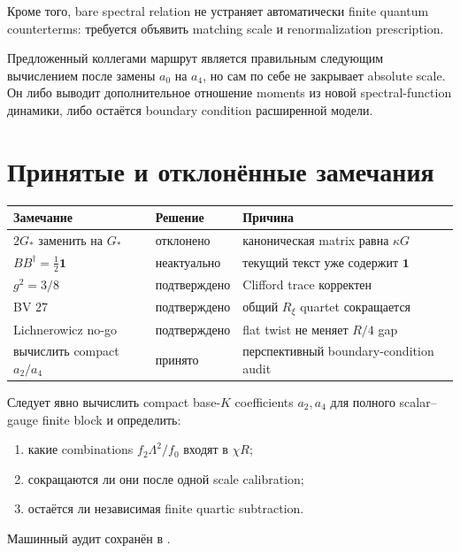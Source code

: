 Кроме того, bare spectral relation не устраняет автоматически finite
quantum counterterms: требуется объявить matching scale и
renormalization prescription.

\begin{theorem}
Предложенный коллегами маршрут является правильным следующим вычислением
после замены \(a_0\) на \(a_4\), но сам по себе не закрывает absolute
scale. Он либо выводит дополнительное отношение moments из новой
spectral-function динамики, либо остаётся boundary condition расширенной
модели.
\end{theorem}

\section{Принятые и отклонённые замечания}

\begin{center}
\begin{tabular}{p{}p{}p{}}
\toprule
Замечание & Решение & Причина \\
\midrule
\(2G_*\) заменить на \(G_*\) & отклонено & каноническая matrix равна \(\kappa G\) \\
\(BB^\dagger=\frac12\mathbf1\) & неактуально & текущий текст уже содержит \(\mathbf1\) \\
\(g^2=3/8\) & подтверждено & Clifford trace корректен \\
BV \(27\) & подтверждено & общий \(R_\xi\) quartet сокращается \\
Lichnerowicz no-go & подтверждено & flat twist не меняет \(R/4\) gap \\
вычислить compact \(a_2/a_4\) & принято & перспективный boundary-condition audit \\
\bottomrule
\end{tabular}
\end{center}

\begin{protocol}
Следует явно вычислить compact base-\(K\) coefficients
\(a_2,a_4\) для полного scalar--gauge finite block и определить:
\begin{enumerate}
 \item какие combinations \(f_2\Lambda^2/f_0\) входят в \(\chi R\);
 \item сокращаются ли они после одной scale calibration;
 \item остаётся ли независимая finite quartic subtraction.
\end{enumerate}
\end{protocol}

Машинный аудит сохранён в
.